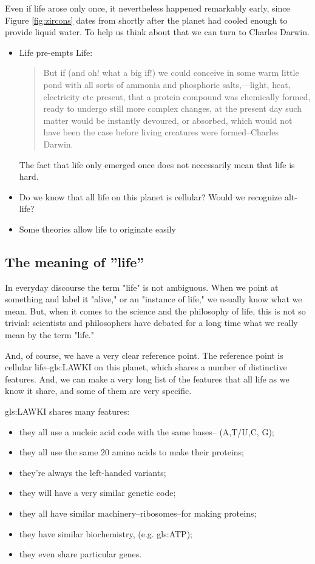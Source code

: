 \documentclass[]{article}
\begin{document}
 Even if life arose only once, it nevertheless happened remarkably early, since Figure \ref{fig:zircons} dates from shortly after the planet had cooled enough to provide liquid water. To help us think about that we can turn to Charles Darwin.
\begin{itemize}
	\item Life pre-empts Life: \begin{quotation}
		But if (and oh! what a big if!) we could conceive in some warm little pond with all sorts of ammonia and phosphoric salts,—light, heat, electricity etc present, that a protein compound was chemically formed, ready to undergo still more complex changes, at the present day such matter would be instantly devoured, or absorbed, which would not have been the case before living creatures were formed--Charles Darwin\cite{darwin1871letter}. 
	\end{quotation}The fact that life only emerged once does not necessarily mean that life is hard.
	
	\item Do we know that all life on this planet is cellular? Would we recognize alt-life?
	
	\item Some theories allow life to originate easily\cite{wachtershauser1988before}
\end{itemize}

\subsection{The meaning of ''life''}
In everyday discourse the term "life" is not ambiguous.
When we point at something and label it "alive," or an "instance of life," we usually know what we mean.
But, when it comes to the science and the philosophy of life, this is not so trivial: scientists and philosophers have debated for a long time what we really mean by the term "life."

And, of course, we have a very clear reference point.
The reference point is cellular life--\gls{gls:LAWKI} on this planet,
which shares a number of distinctive features.
And, we can make a very long list of the features that all life as we know it share, and some of them are very specific.

\gls{gls:LAWKI} shares many features:
\begin{itemize}
	\item they all use a nucleic acid code 	with the same bases-- (A,T/U,C, G);
	\item they all use the same 20 amino acids 	to make their proteins;
	\item they're always the left-handed variants;
	\item they will have a very similar genetic code;
	\item they all have similar machinery--ribosomes--for making proteins;
	\item they have similar biochemistry, (e.g. \gls{gls:ATP});
	\item they even share particular genes.
\end{itemize}
\end{document}
